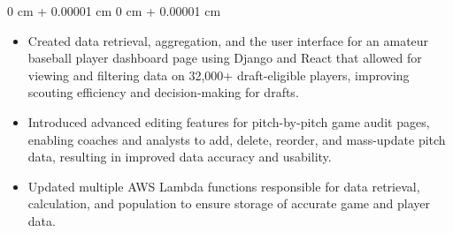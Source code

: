 \documentclass[10pt, letterpaper]{article}
\newenvironment{highlights}{
    \begin{itemize}[
        topsep=0.10 cm,
        parsep=0.10 cm,
        partopsep=0pt,
        itemsep=0pt,
        leftmargin=0 cm + 10pt
    ]
}{
    \end{itemize}
} %
\newenvironment{onecolentry}{
    \begin{adjustwidth}{
        0 cm + 0.00001 cm
    }{
        0 cm + 0.00001 cm
    }
}{
    \end{adjustwidth}
} %
\begin{document}
    \vspace{0.10 cm}
    \begin{onecolentry}
      \begin{highlights}
        \item Created data retrieval, aggregation, and the user interface for an amateur baseball player dashboard page using Django and React that allowed for viewing and filtering data on 32,000+ draft-eligible players, improving scouting efficiency and decision-making for drafts.
        \item Introduced advanced editing features for pitch-by-pitch game audit pages, enabling coaches and analysts to add, delete, reorder, and mass-update pitch data, resulting in improved data accuracy and usability.
        \item Updated multiple AWS Lambda functions responsible for data retrieval, calculation, and population to ensure storage of accurate game and player data.
      \end{highlights}
    \end{onecolentry}
    
\end{document}
